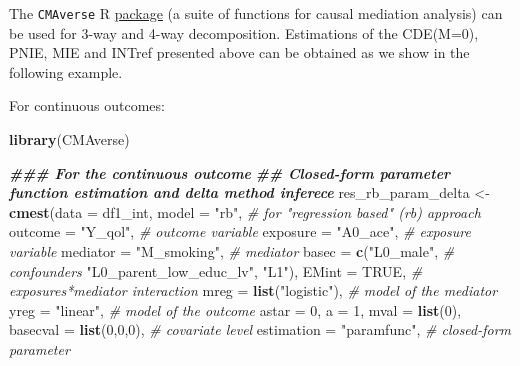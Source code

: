 \documentclass[
]{book}
\newenvironment{Shaded}{\begin{snugshade}}{\end{snugshade}}
\newcommand{\AttributeTok}[1]{\textcolor[rgb]{0.13,0.29,0.53}{#1}}
\newcommand{\CommentTok}[1]{\textcolor[rgb]{0.56,0.35,0.01}{\textit{#1}}}
\newcommand{\ConstantTok}[1]{\textcolor[rgb]{0.56,0.35,0.01}{#1}}
\newcommand{\DecValTok}[1]{\textcolor[rgb]{0.00,0.00,0.81}{#1}}
\newcommand{\DocumentationTok}[1]{\textcolor[rgb]{0.56,0.35,0.01}{\textbf{\textit{#1}}}}
\newcommand{\FunctionTok}[1]{\textcolor[rgb]{0.13,0.29,0.53}{\textbf{#1}}}
\newcommand{\NormalTok}[1]{#1}
\newcommand{\OtherTok}[1]{\textcolor[rgb]{0.56,0.35,0.01}{#1}}
\newcommand{\StringTok}[1]{\textcolor[rgb]{0.31,0.60,0.02}{#1}}
\begin{document}
The \texttt{CMAverse} R \href{https://bs1125.github.io/CMAverse/index.html}{package} (a suite of functions for causal mediation analysis) can be used for 3-way and 4-way decomposition. Estimations of the CDE(M=0), PNIE, MIE and INTref presented above can be obtained as we show in the following example.

For continuous outcomes:

\begin{Shaded}
\begin{Highlighting}[]
\FunctionTok{library}\NormalTok{(CMAverse)}

\DocumentationTok{\#\#\# For the continuous outcome}
\DocumentationTok{\#\# Closed{-}form parameter function estimation and delta method inferece}
\NormalTok{res\_rb\_param\_delta }\OtherTok{\textless{}{-}} \FunctionTok{cmest}\NormalTok{(}\AttributeTok{data =}\NormalTok{ df1\_int,}
                            \AttributeTok{model =} \StringTok{"rb"}\NormalTok{, }\CommentTok{\# for "regression based" (rb) approach}
                            \AttributeTok{outcome =} \StringTok{"Y\_qol"}\NormalTok{,        }\CommentTok{\# outcome variable}
                            \AttributeTok{exposure =} \StringTok{"A0\_ace"}\NormalTok{,      }\CommentTok{\# exposure variable}
                            \AttributeTok{mediator =} \StringTok{"M\_smoking"}\NormalTok{,   }\CommentTok{\# mediator}
                            \AttributeTok{basec =} \FunctionTok{c}\NormalTok{(}\StringTok{"L0\_male"}\NormalTok{,      }\CommentTok{\# confounders}
                                      \StringTok{"L0\_parent\_low\_educ\_lv"}\NormalTok{,}
                                      \StringTok{"L1"}\NormalTok{),}
                            \AttributeTok{EMint =} \ConstantTok{TRUE}\NormalTok{, }\CommentTok{\# exposures*mediator interaction}
                            \AttributeTok{mreg =} \FunctionTok{list}\NormalTok{(}\StringTok{"logistic"}\NormalTok{), }\CommentTok{\# model of the mediator}
                            \AttributeTok{yreg =} \StringTok{"linear"}\NormalTok{,       }\CommentTok{\# model of the outcome}
                            \AttributeTok{astar =} \DecValTok{0}\NormalTok{,}
                            \AttributeTok{a =} \DecValTok{1}\NormalTok{,}
                            \AttributeTok{mval =} \FunctionTok{list}\NormalTok{(}\DecValTok{0}\NormalTok{),}
                            \AttributeTok{basecval =} \FunctionTok{list}\NormalTok{(}\DecValTok{0}\NormalTok{,}\DecValTok{0}\NormalTok{,}\DecValTok{0}\NormalTok{),      }\CommentTok{\# covariate level}
                            \AttributeTok{estimation =} \StringTok{"paramfunc"}\NormalTok{, }\CommentTok{\#  closed{-}form parameter}

\end{Highlighting}
\end{Shaded}
\end{document}
